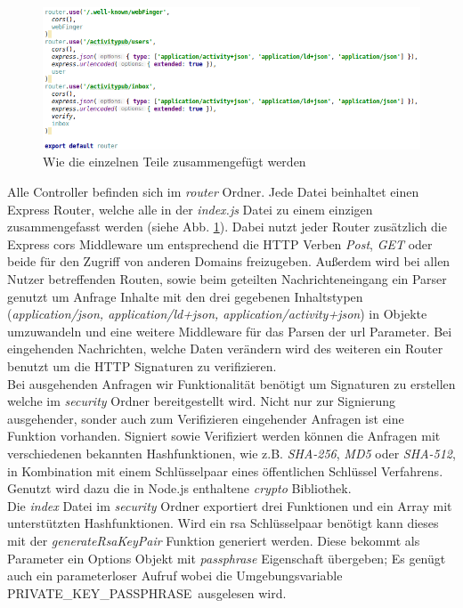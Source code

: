\begin{figure}[H]
	\centering
	\includegraphics[width=15cm]{figures/router-index.png}
	\caption{Wie die einzelnen Teile zusammengefügt werden}
	\label{fig:router-index}
\end{figure}
Alle Controller befinden sich im  \textit{router} Ordner. Jede Datei beinhaltet einen Express Router, welche alle in der \textit{index.js} Datei zu einem einzigen zusammengefasst werden (siehe Abb. \ref{fig:router-index}). Dabei nutzt jeder Router zusätzlich die Express \gls{cors} Middleware um entsprechend die HTTP Verben \textit{Post}, \textit{GET} oder beide für den Zugriff von anderen Domains freizugeben. Außerdem wird bei allen Nutzer betreffenden Routen, sowie beim geteilten Nachrichteneingang ein Parser genutzt um Anfrage Inhalte mit den drei gegebenen Inhaltstypen (\textit{application/json, application/ld+json, application/activity+json}) in Objekte umzuwandeln und eine weitere Middleware für das Parsen der \gls{url} Parameter. Bei eingehenden Nachrichten, welche Daten verändern wird des weiteren ein Router benutzt um die HTTP Signaturen zu verifizieren.\\

Bei ausgehenden Anfragen wir Funktionalität benötigt um Signaturen zu erstellen welche im \textit{security} Ordner bereitgestellt wird. Nicht nur zur Signierung ausgehender, sonder auch zum Verifizieren eingehender Anfragen ist eine Funktion vorhanden. Signiert sowie Verifiziert werden können die Anfragen mit verschiedenen bekannten Hashfunktionen, wie z.B. \textit{SHA-256}, \textit{MD5} oder \textit{SHA-512}, in Kombination mit einem Schlüsselpaar eines öffentlichen Schlüssel Verfahrens. Genutzt wird dazu die in Node.js enthaltene \textit{crypto} Bibliothek.\\

Die \textit{index} Datei im \textit{security} Ordner exportiert drei Funktionen und ein Array mit unterstützten Hashfunktionen. Wird ein \gls{rsa} Schlüsselpaar benötigt kann dieses mit der \textit{generateRsaKeyPair} Funktion generiert werden. Diese bekommt als Parameter ein Options Objekt mit \textit{passphrase} Eigenschaft übergeben; Es genügt auch ein parameterloser Aufruf wobei die Umgebungsvariable \glqq PRIVATE\_KEY\_PASSPHRASE\grqq~ausgelesen wird.\\

